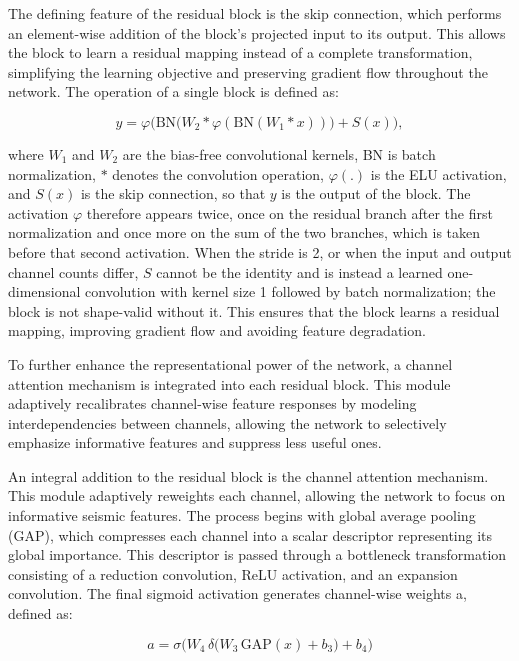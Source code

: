 \documentclass[fleqn,10pt]{wlscirep}
\begin{document}
The defining feature of the residual block is the skip connection, which performs an element-wise addition of the block's projected input to its output. This allows the block to learn a residual mapping instead of a complete transformation, simplifying the learning objective and preserving gradient flow throughout the network. The operation of a single block is defined as:

\begin{equation}
y = \varphi\!\Big(\mathrm{BN}\big(W_2 \ast \varphi(\mathrm{BN}(W_1 \ast x))\big) + S(x)\Big),
\end{equation}

where $W_1$ and $W_2$ are the bias-free convolutional kernels, BN is batch normalization, $\ast$ denotes the convolution operation, $\varphi(.)$ is the ELU activation, and $S(x)$ is the skip connection, so that $y$ is the output of the block. The activation $\varphi$ therefore appears twice, once on the residual branch after the first normalization and once more on the sum of the two branches, which is taken before that second activation. When the stride is 2, or when the input and output channel counts differ, $S$ cannot be the identity and is instead a learned one-dimensional convolution with kernel size 1 followed by batch normalization; the block is not shape-valid without it. This ensures that the block learns a residual mapping, improving gradient flow and avoiding feature degradation.

To further enhance the representational power of the network, a channel attention mechanism is integrated into each residual block. This module adaptively recalibrates channel-wise feature responses by modeling interdependencies between channels, allowing the network to selectively emphasize informative features and suppress less useful ones.

An integral addition to the residual block is the channel attention mechanism. This module adaptively reweights each channel, allowing the network to focus on informative seismic features. The process begins with global average pooling (GAP), which compresses each channel into a scalar descriptor representing its global importance. This descriptor is passed through a bottleneck transformation consisting of a reduction convolution, ReLU activation, and an expansion convolution. The final sigmoid activation generates channel-wise weights a, defined as:

\begin{equation}
a = \sigma\Big( W_4 \, \delta\big( W_3 \, \mathrm{GAP}(x) + b_3 \big) + b_4 \Big)
\end{equation}
\end{document}

